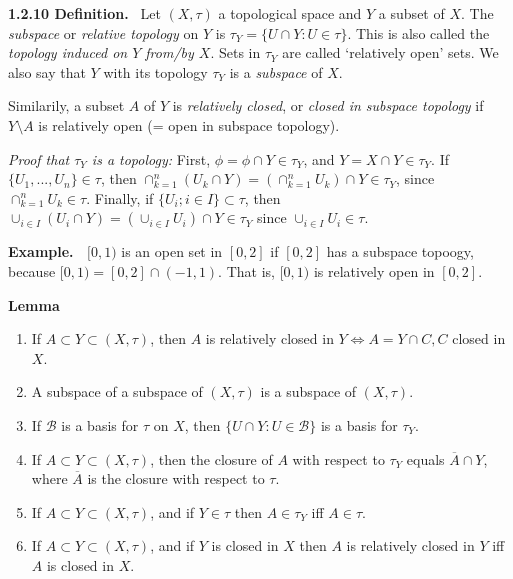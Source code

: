 \documentclass[12pt]{article}
\newcommand{\lrimply}[0] { \Leftrightarrow }
\newcommand{\B}[0] { \mathcal{B} }
\begin{document}
\begin{flushleft}
 { \bf 1.2.10 Definition. } \ Let $(X, \tau)$ a topological space and $Y$ a
subset of $X$.  The \emph{subspace} or \emph{relative topology} on $Y$ is
$\tau_Y = \{ U \cap Y: U \in \tau \}$. This is also
called the \emph{topology induced on $Y$ from/by $X$}. Sets in $\tau_Y$ are
called `relatively open' sets. We also say that $Y$ with its topology $\tau_Y$ is a \emph{subspace} of $X$.

Similarily, a subset $A$ of $Y$ is \emph{relatively closed}, or \emph{closed in subspace topology} if $Y \setminus A$ is relatively open (= open in subspace topology).\begin{flushleft}

 \emph{Proof that $\tau_Y$ is a topology:}  First,
 $\phi = \phi \cap Y \in \tau_Y$, and $Y = X \cap Y \in \tau_Y$.
If  $\{ U_1, ..., U_n \} \in \tau$, then $\cap_{k=1}^n (U_k \cap Y) = \left( \cap_{k=1}^n U_k \right) \cap Y \in \tau_Y$, since $\cap_{k=1}^n U_k \in \tau$. Finally, if $\{ U_i; i \in I \} \subset \tau$, then $\cup_{i \in I} ( U_i \cap Y) = \left( \cup_{i \in I} U_i \right) \cap Y \in \tau_Y$ since $\cup_{i \in I} U_i \in \tau$.\end{flushleft}\end{flushleft}\begin{flushleft}
 { \bf Example. \ }$[0,1)$ is an open set in $[0,2]$ if $[0,2]$ has a subspace topoogy,
because $[0,1) = [0,2] \cap (-1,1)$.
That is, $[0,1)$
 is relatively open in $[0,2]$.\end{flushleft}\begin{flushleft}


 { \bf Lemma }\begin{enumerate}
\item If $A \subset Y \subset (X, \tau)$, then $A$ is relatively closed in $Y \lrimply A = Y \cap C, C$ closed in $X$.
\item A subspace of a subspace of $(X, \tau)$ is a subspace of $(X, \tau)$.
\item If $\B$ is a basis for $\tau$ on $X$, then $\{ U \cap Y :
 U \in \B \}$ is a basis for $\tau_Y$.
\item If $A \subset Y \subset (X, \tau)$, then the closure of $A$ with respect to $\tau_Y$ equals $\overline{A} \cap Y$, where $\overline{A}$ is the closure with respect to $\tau$.
\item  If $A \subset Y \subset (X, \tau)$, and if $Y \in \tau$ then
$A \in \tau_Y$ iff $A \in \tau$.
\item If $A \subset Y \subset (X, \tau)$, and if $Y$ is closed in $X$
then $A$ is relatively closed in $Y$ iff $A$ is closed in $X$.
\end{enumerate}\end{flushleft}
\end{document}
